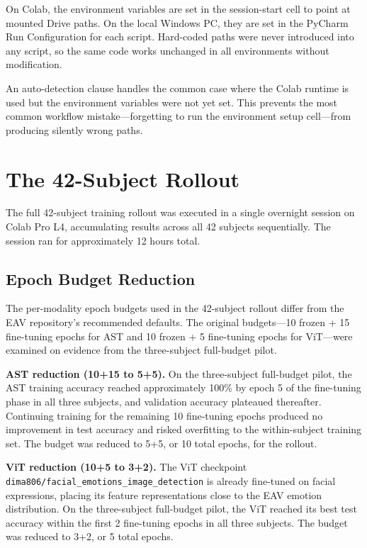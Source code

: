 On Colab, the environment variables are set in the session-start cell to point at mounted Drive paths. On the local Windows PC, they are set in the PyCharm Run Configuration for each script. Hard-coded paths were never introduced into any script, so the same code works unchanged in all environments without modification.

An auto-detection clause handles the common case where the Colab runtime is used but the environment variables were not yet set. This prevents the most common workflow mistake---forgetting to run the environment setup cell---from producing silently wrong paths.

\section{The 42-Subject Rollout}
The full 42-subject training rollout was executed in a single overnight session on Colab Pro L4, accumulating results across all 42 subjects sequentially. The session ran for approximately 12 hours total.

\subsection{Epoch Budget Reduction}
\label{sec:epoch_budget}
The per-modality epoch budgets used in the 42-subject rollout differ from the EAV repository's recommended defaults. The original budgets---10 frozen + 15 fine-tuning epochs for AST and 10 frozen + 5 fine-tuning epochs for ViT---were examined on evidence from the three-subject full-budget pilot.

\textbf{AST reduction (10+15 to 5+5).} On the three-subject full-budget pilot, the AST training accuracy reached approximately 100\% by epoch 5 of the fine-tuning phase in all three subjects, and validation accuracy plateaued thereafter. Continuing training for the remaining 10 fine-tuning epochs produced no improvement in test accuracy and risked overfitting to the within-subject training set. The budget was reduced to 5+5, or 10 total epochs, for the rollout.

\textbf{ViT reduction (10+5 to 3+2).} The ViT checkpoint \texttt{dima806/facial\_emotions\_image\_detection} is already fine-tuned on facial expressions, placing its feature representations close to the EAV emotion distribution. On the three-subject full-budget pilot, the ViT reached its best test accuracy within the first 2 fine-tuning epochs in all three subjects. The budget was reduced to 3+2, or 5 total epochs.

